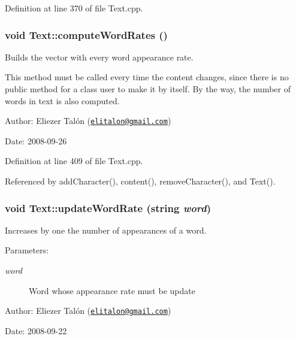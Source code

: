Definition at line 370 of file Text.cpp.\hypertarget{class_text_8239e13039bcc1c713f66f1236693706}{
\subsubsection[computeWordRates]{\setlength{\rightskip}{0pt plus 5cm}void Text::computeWordRates ()}}
\label{class_text_8239e13039bcc1c713f66f1236693706}


Builds the vector with every word appearance rate. 

This method must be called every time the content changes, since there is no public method for a class user to make it by itself. By the way, the number of words in text is also computed.

\begin{Desc}
\item[Author:]Eliezer Talón (\href{mailto:elitalon@gmail.com}{\tt elitalon@gmail.com}) \end{Desc}
\begin{Desc}
\item[Date:]2008-09-26 \end{Desc}


Definition at line 409 of file Text.cpp.

Referenced by addCharacter(), content(), removeCharacter(), and Text().\hypertarget{class_text_7c2b1a540b470cb7aa37fb42070a674f}{
\subsubsection[updateWordRate]{\setlength{\rightskip}{0pt plus 5cm}void Text::updateWordRate (string {\em word})}}
\label{class_text_7c2b1a540b470cb7aa37fb42070a674f}


Increases by one the number of appearances of a word. 

\begin{Desc}
\item[Parameters:]
\begin{description}
\item[{\em word}]Word whose appearance rate must be update\end{description}
\end{Desc}
\begin{Desc}
\item[Author:]Eliezer Talón (\href{mailto:elitalon@gmail.com}{\tt elitalon@gmail.com}) \end{Desc}
\begin{Desc}
\item[Date:]2008-09-22 \end{Desc}


